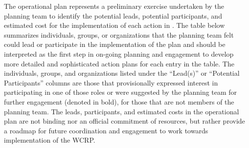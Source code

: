 \documentclass[
  letterpaper,
  DIV=11,
  numbers=noendperiod]{scrreprt}
\begin{document}

The operational plan represents a preliminary exercise undertaken by the
planning team to identify the potential leads, potential participants,
and estimated cost for the implementation of each action in . The table
below summarizes individuals, groups, or organizations that the planning
team felt could lead or participate in the implementation of the plan
and should be interpreted as the first step in on-going planning and
engagement to develop more detailed and sophisticated action plans for
each entry in the table. The individuals, groups, and organizations
listed under the ``Lead(s)'' or ``Potential Participants'' columns are
those that provisionally expressed interest in participating in one of
those roles or were suggested by the planning team for further
engagement (denoted in bold), for those that are not members of the
planning team. The leads, participants, and estimated costs in the
operational plan are not binding nor an official commitment of
resources, but rather provide a roadmap for future coordination and
engagement to work towards implementation of the WCRP.
\end{document}
